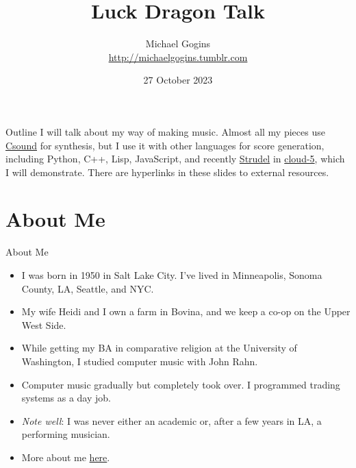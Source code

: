 \documentclass{beamer}
\title[Luck Dragon] %
{Luck Dragon Talk}
\author[Gogins] %
{Michael Gogins \\ \url{http://michaelgogins.tumblr.com} }
\institute[Irreducible Productions] %
{
  Irreducible Productions\\
  New York
}
\date[27 October 2023] %
{27 October 2023}
\begin{document}

\begin{frame}
  \titlepage
\end{frame}

\begin{frame}{Outline}
	I will talk about my way of making music. Almost all my pieces use \href{http://csound.github.io/}{Csound} for synthesis, but I use it with other languages for score generation, including Python, C++, Lisp, JavaScript, and recently \href{https://github.com/tidalcycles/strudel}{Strudel} in \href{https://gogins.github.io/cloud-5.html/}{cloud-5}, which I will demonstrate. There are hyperlinks in these slides to external resources.
\tableofcontents
\end{frame}

\section{About Me}
\begin{frame}{About Me}

\begin{itemize}
\item I was born in 1950 in Salt Lake City. I've lived in Minneapolis, Sonoma County, LA, Seattle, and NYC.
\item My wife Heidi and I own a farm in Bovina, and we keep a co-op on the Upper West Side.
\item While getting my BA in comparative religion at the University of Washington, I studied computer music with John Rahn.
\item Computer music gradually but completely took over. I programmed trading systems as a day job.
\item \emph{Note well}: I was never either an academic or, after a few years in LA, a performing musician.
\item More about me \href{https://michaelgogins.tumblr.com/}{here}.
\end{itemize}

\end{frame}
\end{document}
